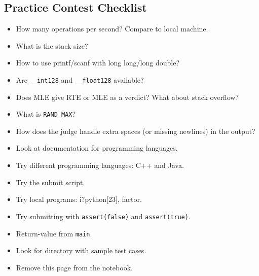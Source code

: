 \documentclass[8pt,a4paper,landscape,oneside]{amsart}
\begin{document}
\begin{multicols*}{3}
    \clearpage
    \section*{Practice Contest Checklist}
        \begin{itemize}
            \item How many operations per second? Compare to local machine.
            \item What is the stack size?
            \item How to use printf/scanf with long long/long double?
            \item Are \texttt{\_{}\_{}int128} and \texttt{\_{}\_{}float128} available?
            \item Does MLE give RTE or MLE as a verdict? What about stack overflow?
            \item What is \texttt{RAND\_{}MAX}?
            \item How does the judge handle extra spaces (or missing newlines) in the output?
            \item Look at documentation for programming languages.
            \item Try different programming languages: C++ and Java.
            \item Try the submit script.
            \item Try local programs: i?python[23], factor.
            \item Try submitting with \texttt{assert(false)} and \texttt{assert(true)}.
            \item Return-value from \texttt{main}.
            \item Look for directory with sample test cases.

            \item Remove this page from the notebook.
        \end{itemize}
\end{multicols*}
\end{document}
